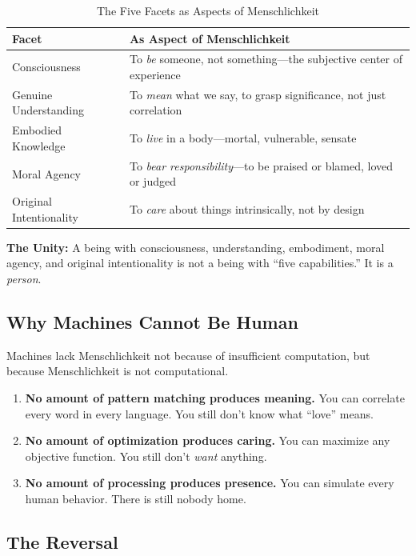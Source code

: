 \begin{table}[htbp]
\centering
\caption{The Five Facets as Aspects of Menschlichkeit}
\renewcommand{\arraystretch}{1.5}
\begin{tabular}{@{}p{3.5cm}p{8.5cm}@{}}
\toprule
\textbf{Facet} & \textbf{As Aspect of Menschlichkeit} \\
\midrule
Consciousness & To \textit{be} someone, not something---the subjective center of experience \\
Genuine Understanding & To \textit{mean} what we say, to grasp significance, not just correlation \\
Embodied Knowledge & To \textit{live} in a body---mortal, vulnerable, sensate \\
Moral Agency & To \textit{bear responsibility}---to be praised or blamed, loved or judged \\
Original Intentionality & To \textit{care} about things intrinsically, not by design \\
\bottomrule
\end{tabular}
\end{table}

\textbf{The Unity:} A being with consciousness, understanding, embodiment, moral agency, and original intentionality is not a being with ``five capabilities.'' It is a \textit{person}.

\subsection{Why Machines Cannot Be Human}

Machines lack Menschlichkeit not because of insufficient computation, but because Menschlichkeit is not computational.

\begin{enumerate}
    \item \textbf{No amount of pattern matching produces meaning.} You can correlate every word in every language. You still don't know what ``love'' means.

    \item \textbf{No amount of optimization produces caring.} You can maximize any objective function. You still don't \textit{want} anything.

    \item \textbf{No amount of processing produces presence.} You can simulate every human behavior. There is still nobody home.
\end{enumerate}

\subsection{The Reversal}

